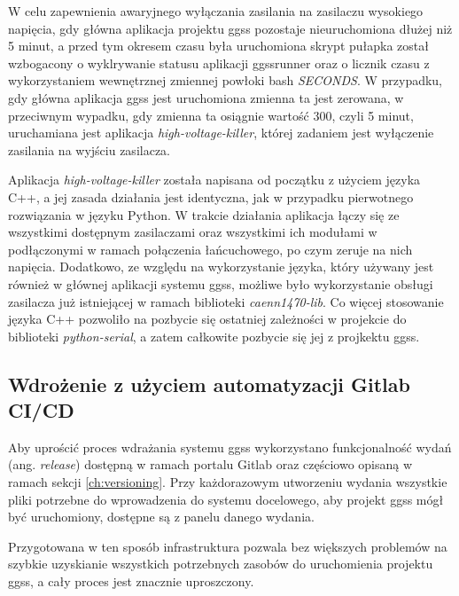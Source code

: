 W celu zapewnienia awaryjnego wyłączania zasilania na zasilaczu wysokiego napięcia, gdy główna aplikacja projektu ggss pozostaje nieuruchomiona dłużej niż 5 minut, a przed tym okresem czasu była uruchomiona skrypt pułapka został wzbogacony o wyklrywanie statusu aplikacji ggssrunner oraz o licznik czasu z wykorzystaniem wewnętrznej zmiennej powłoki bash \emph{SECONDS}. W przypadku, gdy główna aplikacja ggss jest uruchomiona zmienna ta jest zerowana, w przeciwnym wypadku, gdy zmienna ta osiągnie wartość 300, czyli 5 minut, uruchamiana jest aplikacja \emph{high-voltage-killer}, której zadaniem jest wyłączenie zasilania na wyjściu zasilacza.

Aplikacja \emph{high-voltage-killer} została napisana od początku z użyciem języka C++, a jej zasada działania jest identyczna, jak w przypadku pierwotnego rozwiązania w języku Python. W trakcie działania aplikacja łączy się ze wszystkimi dostępnym zasilaczami oraz wszystkimi ich modułami w podłączonymi w ramach połączenia łańcuchowego, po czym zeruje na nich napięcia. Dodatkowo, ze względu na wykorzystanie języka, który używany jest również w głównej aplikacji systemu ggss, możliwe było wykorzystanie obsługi zasilacza już istniejącej w ramach biblioteki \emph{caenn1470-lib}. Co więcej stosowanie języka C++ pozwoliło na pozbycie się ostatniej zależności w projekcie do biblioteki \emph{python-serial}, a zatem całkowite pozbycie się jej z projkektu ggss.

\subsection{Wdrożenie z użyciem automatyzacji Gitlab CI/CD}

Aby uprościć proces wdrażania systemu ggss wykorzystano funkcjonalność wydań (ang. \emph{release}) dostępną w ramach portalu Gitlab oraz częściowo opisaną w ramach sekcji \ref{ch:versioning}. Przy każdorazowym utworzeniu wydania wszystkie pliki potrzebne do wprowadzenia do systemu docelowego, aby projekt ggss mógł być uruchomiony, dostępne są z panelu danego wydania.


Przygotowana w ten sposób infrastruktura pozwala bez większych problemów na szybkie uzyskianie wszystkich potrzebnych zasobów do uruchomienia projektu ggss, a cały proces jest znacznie uproszczony.